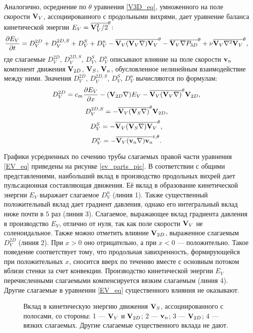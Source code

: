 Аналогично, осреднение по $\theta$ уравнения \eqref{V3D_eq}, умноженного на поле скорости $\mathbf{V}_V$, ассоциированного с продольными вихрями, дает уравнение баланса кинетической энергии $E_V = \overline{\mathbf{V}_V^2/2}^\theta$:
\begin{equation}\label{EV_eq}
\frac{\partial E_V}{\partial t} = D_V^{2D} + D_V^{2D,S} + D_V^{S} + D_V^n - \overline{\mathbf{V}_V (\mathbf{V}_V \nabla) \mathbf{V}_V}^\theta - \overline{\mathbf{V}_V \nabla P_{3D}}^\theta + \nu \overline{\mathbf{V}_V \nabla^2 \mathbf{V}_V}^\theta,
\end{equation}
где слагаемые $D_V^{2D}$, $D_V^{2D,S}$, $D_V^S$, $D_V^n$ описывают влияние на поле скорости $\mathbf{v}_n$ компонент движения $\mathbf{V}_{2D}$, $\mathbf{V}_S$, $\mathbf{V}_n$, обусловленное нелинейным взаимодействие между ними. Значения $D_V^{2D}$, $D_V^{2D,S}$, $D_V^S$, $D_V^n$ вычисляются по формулам:
$$
D_V^{2D} = c_m \frac{\partial E_V}{\partial x} - (\mathbf{V}_{2D} \nabla) E_V - \overline{\mathbf{V}_V (\mathbf{V}_V \nabla)}^\theta \mathbf{V}_{2D},
$$
$$
D_V^{2D,S} = - \overline{\mathbf{V}_V (\mathbf{V}_S \nabla)}^\theta \mathbf{V}_{2D},
$$
$$
D_V^{S} = - \overline{\mathbf{V}_V (\mathbf{V}_S \nabla) \mathbf{V}_V}^\theta,
$$
$$
D_V^n = - \overline{\mathbf{V}_V (\mathbf{v}_n \nabla) \mathbf{v}_n}^{t,\theta}.
$$

Графики усредненных по сечению трубы слагаемых правой части уравнения \eqref{EV_eq} приведены на рисунке \ref{ev_parts_pic}. В соответствии с общими представлениями, наибольший вклад в производство продольных вихрей дает пульсационная составляющая движения. Её вклад в образование кинетической энергии $E_V$ выражает слагаемое $D_V^n$ (линия 1). Также существенный положительный вклад дает градиент давления, однако его интегральный вклад ниже почти в $5$ раз (линия 3). Слагаемое, выражающее вклад градиента давления в производство $E_V$, отлично от нуля, так как поле скорости $\mathbf{V}_V$ не соленоидальное. Также можно отметить влияние $\mathbf{V}_{2D}$, выраженное слагаемым $D_V^{2D}$ (линия 2). При $x > 0$ оно отрицательно, а при $x < 0$ --- положительно. Такое поведение соответствует тому, что продольная завихренность, формирующейся при положительных $x$, сносится вверх по течению вместе с основным потоком вблизи стенки за счет конвекции. Производство кинетической энергии $E_V$ перечисленными слагаемыми компенсируется вязким слагаемым (линия 4). Другие слагаемые в уравнении \eqref{EV_eq} существенного влияния не оказывают. 

\begin{figure}
\caption{Вклад в кинетическую энергию движения $\mathbf{V}_S$, ассоциированного с полосами, со стороны: 1 --- $\mathbf{V}_V$ и $\mathbf{V}_{2D}$; 2 --- $\mathbf{v}_n$; 3 --- $\mathbf{V}_{2D}$; 4 --- вязких слагаемых. Другие слагаемые существенного вклада не дают.}
\label{es_parts_pic}
\end{figure}

